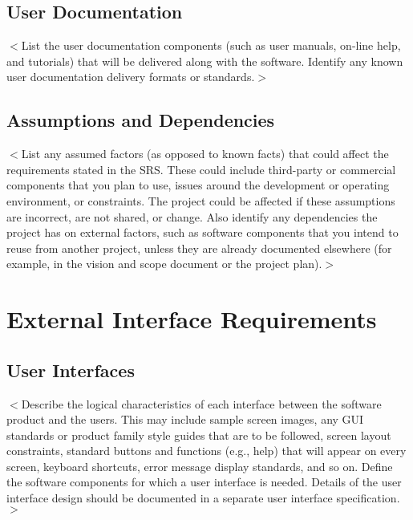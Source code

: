 \documentclass{scrreprt}
\begin{document}
\section{User Documentation}
\begin{CJK}{UTF8}{<font>}
$<$List the user documentation components (such as user manuals, on-line help, 
and tutorials) that will be delivered along with the software. Identify any 
known user documentation delivery formats or standards.$>$
\end{CJK}

\section{Assumptions and Dependencies}
\begin{CJK}{UTF8}{<font>}
$<$List any assumed factors (as opposed to known facts) that could affect the 
requirements stated in the SRS. These could include third-party or commercial 
components that you plan to use, issues around the development or operating 
environment, or constraints. The project could be affected if these assumptions 
are incorrect, are not shared, or change. Also identify any dependencies the 
project has on external factors, such as software components that you intend to 
reuse from another project, unless they are already documented elsewhere (for 
example, in the vision and scope document or the project plan).$>$
\end{CJK}

\chapter{External Interface Requirements}

\section{User Interfaces}
\begin{CJK}{UTF8}{<font>}
$<$Describe the logical characteristics of each interface between the software 
product and the users. This may include sample screen images, any GUI standards 
or product family style guides that are to be followed, screen layout 
constraints, standard buttons and functions (e.g., help) that will appear on 
every screen, keyboard shortcuts, error message display standards, and so on.  
Define the software components for which a user interface is needed. Details of 
the user interface design should be documented in a separate user interface 
specification.$>$
\end{CJK}
\end{document}
